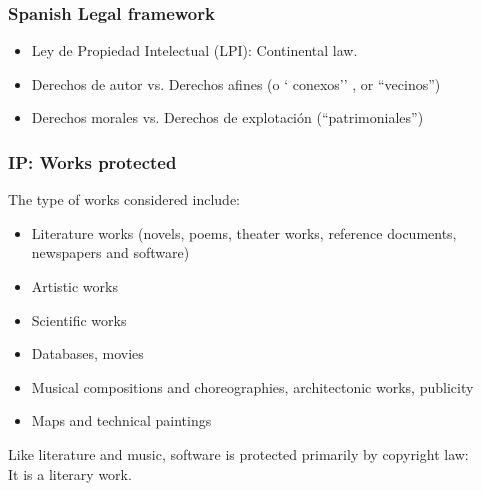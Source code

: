 \begin{frame}
\frametitle{Spanish Legal framework}

\begin{itemize}
\item Ley de Propiedad Intelectual (LPI): Continental law. 
\item Derechos de autor vs. Derechos afines (o ` conexos'' , or ``vecinos'') 
\item Derechos morales vs. Derechos de explotación (``patrimoniales'')
\end{itemize}

\end{frame}



\begin{frame}
\frametitle{IP: Works protected}

The type of works considered include:

\begin{itemize}
\item Literature works (novels, poems, theater works, reference documents, newspapers and software)
\item Artistic works 
\item Scientific works 
\item Databases, movies 
\item Musical compositions and choreographies, architectonic works, publicity 
\item Maps and technical paintings
\end{itemize}

\begin{center}
\footnotesize
Like literature and music, \alert{software} is protected primarily by copyright law: \\ It is a \alert{literary work}.
\end{center}

\end{frame}



